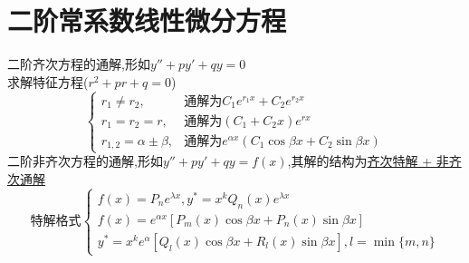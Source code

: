\documentclass[12pt, a4paper, oneside, UTF8]{ctexbook}
\begin{document}
\section{二阶常系数线性微分方程}
\begin{remark}
    二阶齐次方程的通解,形如$y''+py'+qy=0$ \\
    求解特征方程($r^2+pr+q=0$)
    $$
    \begin{cases}
        r_1\neq r_2, & \text{通解为} C_1e^{r_1 x} + C_2e^{r_2 x} \\
        r_1=r_2=r, & \text{通解为} (C_1 + C_2 x)e^{rx} \\
        r_{1,2}=\alpha\pm\beta, &\text{通解为} e^{\alpha x}(C_1\cos{\beta x}+C_2\sin{\beta x})
    \end{cases}
    $$
    二阶非齐次方程的通解,形如$y''+py'+qy=f(x)$,其解的结构为\underline{齐次特解 + 非齐次通解}
    $$
    \text{特解格式}
    \begin{cases}
        f(x)=P_ne^{\lambda x},y^{*}=x^kQ_n(x)e^{\lambda x} \\
        f(x)=e^{\alpha x}[P_{m}(x)\cos{\beta x}+P_{n}(x)\sin{\beta x}] \\
        y^{*}=x^ke^{\alpha}[Q_{l}(x)\cos{\beta x}+R_{l}(x)\sin{\beta x}], l = \min{\{m,n\}}
    \end{cases}
    $$
\end{remark}
\end{document}
